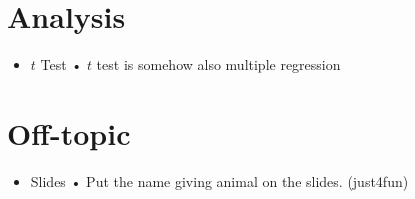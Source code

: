 \section{Analysis}

	\begin{itemize}
		\item \(t\) Test
			\newline • \(t\) test is somehow also multiple regression
	\end{itemize}

\section{Off-topic}

	\begin{itemize}
		\item Slides
			\newline • Put the name giving animal on the slides. (just4fun)
	\end{itemize}

